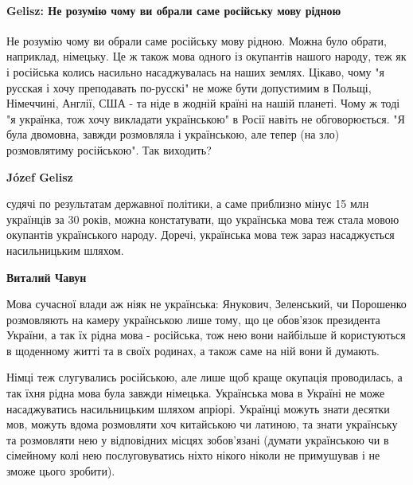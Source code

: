  
 
 
 
 
\paragraph{Gelisz: Не розумію чому ви обрали саме російську мову рідною}
\label{sec:18_01_2021.fb.bilchenko_evgenia.1.mova_jazyk.cmt.gelisz_ridna_mova}

\begin{itemize}


Не розумію чому ви обрали саме російську мову рідною. Можна було обрати,
наприклад, німецьку. Це ж також мова одного із окупантів нашого народу, теж як
і російська колись насильно насаджувалась на наших землях. Цікаво, чому "я
русская і хочу преподавать по-русскі" не може бути допустимим в Польщі,
Німеччині, Англії, США - та ніде в жодній країні на нашій планеті. Чому ж тоді
"я українка, тож хочу викладати українською" в Росії навіть не обговорюється.
"Я була двомовна, завжди розмовляла і українською, але тепер (на зло)
розмовлятиму російською". Так виходить?

\begin{itemize}


\textbf{Józef Gelisz} 

судячі по результатам державної політики, а саме приблизно мінус 15 млн
українців за 30 років, можна констатувати, що українська мова теж стала мовою
окупантів українського народу. Доречі, українська мова теж зараз насаджується
насильницьким шляхом.

\textbf{Виталий Чавун} 

Мова сучасної влади аж ніяк не українська: Янукович, Зеленський, чи Порошенко
розмовляють на камеру українською лише тому, що це обов'язок президента
України, а так їх рідна мова - російська, тож нею вони найбільше й користуються
в щоденному житті та в своїх родинах, а також саме на ній вони й думають. 

Німці теж слугувались російською, але лише щоб краще окупація проводилась, а
так їхня рідна мова була завжди німецька. Українська мова в Україні не може
насаджуватись насильницьким шляхом апріорі. Українці можуть знати десятки мов,
можуть вдома розмовляти хоч китайською чи латиною, та знати українську та
розмовляти нею у відповідних місцях зобов'язані (думати українською чи в
сімейному колі нею послуговуватись ніхто нікого ніколи не примушував і не зможе
цього зробити). 


\end{itemize}
\end{itemize}
